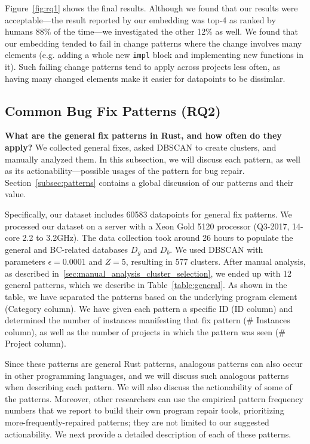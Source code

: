 Figure~\ref{fig:rq1} shows the final results. Although we found that our results were acceptable---the result reported by our embedding was top-4 as ranked by humans 88\% of the time---we investigated the other 12\% as well. We found that our embedding tended to fail in change patterns where the change involves many elements (e.g. adding a whole new \verb+impl+ block and implementing new functions in it). Such failing change patterns tend to apply across projects less often, as having many changed elements make it easier for datapoints to be dissimlar.

\subsection{\label{sec:common_patterns}Common Bug Fix Patterns (RQ2)}

\textbf{What are the general fix patterns in Rust, and how often do they apply?} 
We collected general fixes, asked DBSCAN to create clusters, and manually analyzed them. In this subsection, we will discuss each pattern, as well as its actionability---possible usages of the pattern for bug repair. Section~\ref{subsec:patterns} contains a global discussion of our patterns and their value.

Specifically, our dataset includes 60583 datapoints for general fix patterns. We processed our dataset on a server with a Xeon Gold 5120 processor (Q3-2017, 14-core 2.2 to 3.2GHz). The data collection took around 26 hours to populate the general and BC-related databases $D_g$ and $D_b$. We used DBSCAN with parameters $\epsilon=0.0001$ and $Z=5$, resulting in 577 clusters. After manual analysis, as described in~\ref{sec:manual_analysis_cluster_selection}, we ended up with 12 general patterns, which we describe in Table~\ref{table:general}. As shown in the table, we have separated the patterns based on the underlying program element (Category column). We have given each pattern a specific ID (ID column) and determined the number of instances manifesting that fix pattern (\# Instances column), as well as the number of projects in which the pattern was seen (\# Project column).

Since these patterns are general Rust patterns, analogous patterns can also occur in other programming languages, and we will discuss such analogous patterns when describing each pattern. We will also discuss the actionability of some of the patterns. Moreover, other researchers can use the empirical pattern frequency numbers that we report to build their own program repair tools, prioritizing more-frequently-repaired patterns; they are not limited to our suggested actionability. We next provide a detailed description of each of these patterns.

